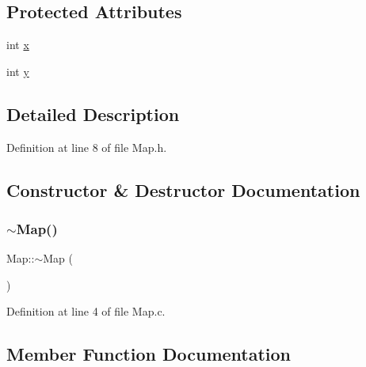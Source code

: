 \subsection*{Protected Attributes}
\begin{DoxyCompactItemize}
\item 
int \mbox{\hyperlink{class_world_architect_1_1_map_a1b4cf9200dca11577b4567584a1e62b8}{x}}
\item 
int \mbox{\hyperlink{class_world_architect_1_1_map_abd1e160bb8b03587caac4fb508c13307}{y}}
\end{DoxyCompactItemize}


\subsection{Detailed Description}


Definition at line 8 of file Map.\+h.



\subsection{Constructor \& Destructor Documentation}
\mbox{\label{class_world_architect_1_1_map_add0f5f3c2af54df264d4d257814a58a3}} 
\subsubsection{\texorpdfstring{$\sim$Map()}{~Map()}}
{\footnotesize\ttfamily Map\+::$\sim$\+Map (\begin{DoxyParamCaption}{ }\end{DoxyParamCaption})\hspace{0.3cm}{\ttfamily [pure virtual]}}



Definition at line 4 of file Map.\+c.



\subsection{Member Function Documentation}
\mbox{\label{class_world_architect_1_1_map_aeb09ef48c0b9cb0e0ff33b9ca4842829}} 
